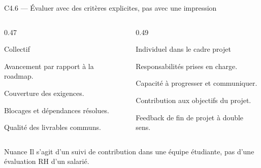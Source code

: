 \begin{frame}{C4.6 — Évaluer avec des critères explicites, pas avec une impression}
\begin{columns}[T]
\begin{column}{0.47\linewidth}
\begin{block}{Collectif}
\begin{tightitems}
  \item Avancement par rapport à la roadmap.
  \item Couverture des exigences.
  \item Blocages et dépendances résolues.
  \item Qualité des livrables communs.
\end{tightitems}
\end{block}
\end{column}
\begin{column}{0.49\linewidth}
\begin{block}{Individuel dans le cadre projet}
\begin{tightitems}
  \item Responsabilités prises en charge.
  \item Capacité à progresser et communiquer.
  \item Contribution aux objectifs du projet.
  \item Feedback de fin de projet à double sens.
\end{tightitems}
\end{block}
\end{column}
\end{columns}
\begin{block}{Nuance}
Il s'agit d'un suivi de contribution dans une équipe étudiante, pas d'une évaluation RH d'un salarié.
\end{block}
\end{frame}

